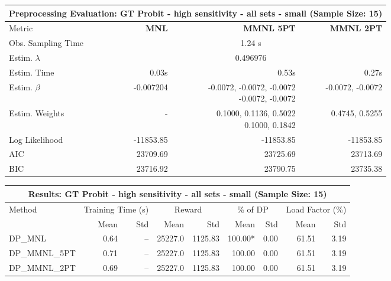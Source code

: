 
\begin{samepage}
\begin{center}
  \small
  \begin{tabular}{l|r|r|r}
    \toprule
    \multicolumn{4}{c}{\textbf{Preprocessing Evaluation: GT Probit - high sensitivity - all sets - small (Sample Size: 15)}} \\
    \midrule
    Metric & \textbf{MNL} & \textbf{MMNL 5PT} & \textbf{MMNL 2PT} \\
    \midrule
    Obs. Sampling Time & \multicolumn{3}{c}{1.24 s} \\
    Estim. $\lambda$ & \multicolumn{3}{c}{0.496976} \\
    Estim. Time & 0.03s & 0.53s & 0.27s \\
    Estim. $\beta$ & -0.007204 & \makecell[tr]{-0.0072, -0.0072, -0.0072 \\ -0.0072, -0.0072} & -0.0072, -0.0072 \\
    Estim. Weights & - & \makecell[tr]{0.1000, 0.1136, 0.5022 \\ 0.1000, 0.1842} & 0.4745, 0.5255 \\
    Log Likelihood & -11853.85 & -11853.85 & -11853.85 \\
    AIC & 23709.69 & 23725.69 & 23713.69 \\
    BIC & 23716.92 & 23790.75 & 23735.38 \\
    \bottomrule
  \end{tabular}
\end{center}
\begin{center}
  \small
  \begin{tabular}{l|rr|rr|rr|rr}
    \toprule
    \multicolumn{9}{c}{\textbf{Results: GT Probit - high sensitivity - all sets - small (Sample Size: 15)}} \\
    \midrule
    Method & \multicolumn{2}{c|}{Training Time (s)} & \multicolumn{2}{c|}{Reward} & \multicolumn{2}{c|}{\% of DP} & \multicolumn{2}{c}{Load Factor (\%)} \\
    & Mean & Std & Mean & Std & Mean & Std & Mean & Std \\
    \midrule
    DP\_MNL      &     0.64 &    -- &    25227.0 &    1125.83 & 100.00* &    0.00 &   61.51 &    3.19 \\
    DP\_MMNL\_5PT &     0.71 &    -- &    25227.0 &    1125.83 &  100.00 &    0.00 &   61.51 &    3.19 \\
    DP\_MMNL\_2PT &     0.69 &    -- &    25227.0 &    1125.83 &  100.00 &    0.00 &   61.51 &    3.19 \\

\end{tabular}
\end{center}
\end{samepage}
